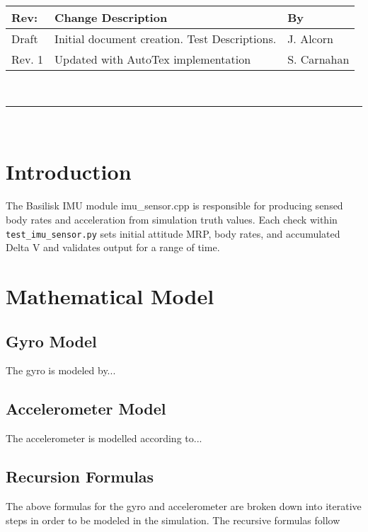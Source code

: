 \documentclass[]{BasiliskReportMemo}
\newcommand{\preparer}{S. Carnahan}
\begin{document}
\makeCover


%
%
\pagestyle{empty}
{\renewcommand{\arraystretch}{1.1}
\noindent
\begin{longtable}{|p{0.5in}|p{4.5in}|p{1.14in}|}
\hline
{\bfseries Rev}: & {\bfseries Change Description} & {\bfseries By} \\
\hline
Draft & Initial document creation. Test Descriptions. & J. Alcorn \\
\hline
Rev. 1 & Updated with AutoTex implementation & \preparer \\
\hline

\end{longtable}
}

\newpage
\setcounter{page}{1}
\pagestyle{fancy}

\tableofcontents
~\\ \hrule ~\\


\section{Introduction}
The Basilisk IMU module imu\_sensor.cpp is responsible for producing sensed body rates and acceleration from simulation truth values. Each check within {\tt test\_imu\_sensor.py} sets initial attitude MRP, body rates, and accumulated Delta V and validates output for a range of time.

\section{Mathematical Model}

\subsection{Gyro Model}
The gyro is modeled by...
\subsection{Accelerometer Model}
The accelerometer is modelled according to...
\subsection{Recursion Formulas}
The above formulas for the gyro and accelerometer are broken down into iterative steps in order to be modeled in the simulation. The recursive formulas follow
\end{document}
